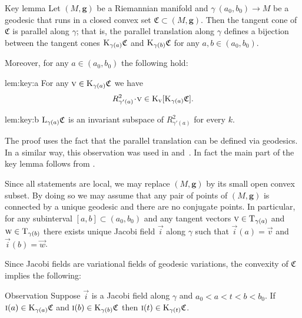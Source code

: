 \documentclass[a4paper,10pt]{article}
\begin{document}
\begin{thm}{Key lemma}\label{lem:key}
Let $(M,\bm{g})$ be a Riemannian manifold and $\gamma\:(a_0,b_0)\to M$ be a geodesic that runs in a closed convex set $\mathfrak{C}\subset (M,\bm{g})$.
Then the tangent cone of $\mathfrak{C}$ is parallel along $\gamma$; that is, the parallel translation along $\gamma$ defines a bijection between the tangent cones $\mathrm{K}_{\gamma(a)}\mathfrak{C}$ and $\mathrm{K}_{\gamma(b)}\mathfrak{C}$ for any $a,b \in (a_0,b_0)$.

Moreover, for any $a\in (a_0,b_0)$ the following hold:
\begin{subthm}{lem:key:a}
For any $\text{\sc{v}}\in \mathrm{K}_{\gamma(a)}\mathfrak{C}$ we have
\[R^2_{\gamma'(a)}\cdot \vec{v}\in \K_\vec{v}[\K_{\gamma(a)}\mathfrak{C}].\]
\end{subthm}

\begin{subthm}{lem:key:b} 
$\mathrm{L}_{\gamma(a)}\mathfrak{C}$ is an invariant subspace of $R^2_{\gamma'(a)}$ for every $k$.
\end{subthm}

\end{thm}

The proof uses the fact that the parallel translation can be defined via geodesics.
In a similar way, this observation was used in \cite[Section 13]{Ber-Nik} and~\cite{Petruninpar}.
In fact the main part of the key lemma follows from
\cite{Petruninpar}.

Since all statements are local, we may replace $(M,\bm{g})$ by its small open convex subset.
By doing so we may assume that any pair of points of $(M,\bm{g})$ is connected by a unique geodesic and there are no conjugate points.
In particular, for any subinterval $[a,b]\subset (a_0,b_0)$ and any tangent vectors $\text{\sc{v}} \in \mathrm{T}_{\gamma (a)}$ and $\text{\sc{w}} \in \mathrm{T}_{\gamma (b)}$ there exists unique Jacobi field $\vec{i}$ along $\gamma$ 
such that $\vec{i}(a)=\vec{v}$ and $\vec{i}(b)=\vec{w}$.

Since Jacobi fields are variational fields of geodesic variations, 
the convexity of $\mathfrak{C}$ implies the following: 

\begin{thm}{Observation}
Suppose $\vec{i}$ is a Jacobi field along %
$\gamma$ and $a_0<a<t<b<b_0$.
If 
$\text{\sc{i}}(a)\in \mathrm{K}_{\gamma(a)}\mathfrak{C}$ and $\text{\sc{i}}(b)\in \mathrm{K}_{\gamma(b)}\mathfrak{C}$
then $\text{\sc{i}}(t)\in \mathrm{K}_{\gamma(t)}\mathfrak{C}$.
\end{thm}%
\end{document}
